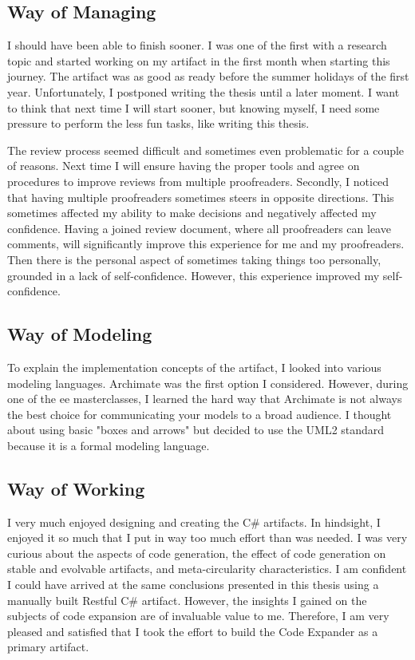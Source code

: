 \subsection{Way of Managing}

I should have been able to finish sooner. I was one of the first with a research topic and
started working on my artifact in the first month when starting this journey. The artifact
was as good as ready before the summer holidays of the first year. Unfortunately, I
postponed writing the thesis until a later moment. I want to think that next time I will
start sooner, but knowing myself, I need some pressure to perform the less fun tasks, like
writing this thesis.

The review process seemed difficult and sometimes even problematic for a couple of
reasons. Next time I will ensure having the proper tools and agree on procedures to
improve reviews from multiple proofreaders. Secondly, I noticed that having multiple
proofreaders sometimes steers in opposite directions. This sometimes affected my ability
to make decisions and negatively affected my confidence. Having a joined review document,
where all proofreaders can leave comments, will significantly improve this experience for
me and my proofreaders. Then there is the personal aspect of sometimes taking things too
personally, grounded in a lack of self-confidence. However, this experience improved my
self-confidence. 

\subsection{Way of Modeling}

To explain the implementation concepts of the artifact, I looked into various modeling
languages. Archimate was the first option I considered. However, during one of the \gls{ee}
masterclasses, I learned the hard way that Archimate is not always the best choice for
communicating your models to a broad audience. I thought about using basic "boxes and
arrows" but decided to use the UML2 standard because it is a formal modeling language.

\subsection{Way of Working}

I very much enjoyed designing and creating the C\# artifacts. In hindsight, I enjoyed it
so much that I put in way too much effort than was needed. I was very curious about the
aspects of code generation, the effect of code generation on stable and evolvable
artifacts, and meta-circularity characteristics. I am confident I could have arrived at
the same conclusions presented in this thesis using a manually built Restful C\# artifact.
However, the insights I gained on the subjects of code expansion are of invaluable value
to me. Therefore, I am very pleased and satisfied that I took the effort to build the Code
Expander as a primary artifact. 

